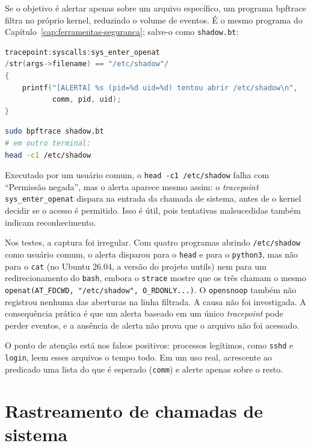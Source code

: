 Se o objetivo é alertar apenas sobre um arquivo específico, um programa bpftrace
filtra no próprio kernel, reduzindo o volume de eventos. É o mesmo programa do
Capítulo~\ref{cap:ferramentas-seguranca}; salve-o como \texttt{shadow.bt}:

\begin{lstlisting}[language=C, caption={\texttt{shadow.bt}: alerta de abertura de \texttt{/etc/shadow}.}]
tracepoint:syscalls:sys_enter_openat
/str(args->filename) == "/etc/shadow"/
{
    printf("[ALERTA] %s (pid=%d uid=%d) tentou abrir /etc/shadow\n",
           comm, pid, uid);
}
\end{lstlisting}

\begin{lstlisting}[language=bash, caption={Execução do alerta e geração de um evento de teste.}]
sudo bpftrace shadow.bt
# em outro terminal:
head -c1 /etc/shadow
\end{lstlisting}

Executado por um usuário comum, o \texttt{head -c1 /etc/shadow} falha com
``Permissão negada'', mas o alerta aparece mesmo assim: o \textit{tracepoint}
\texttt{sys\_enter\_openat} dispara na entrada da chamada de sistema, antes de o
kernel decidir se o acesso é permitido. Isso é útil, pois tentativas malsucedidas
também indicam reconhecimento.

Nos testes, a captura foi irregular. Com quatro programas abrindo
\texttt{/etc/shadow} como usuário comum, o alerta disparou para o \texttt{head} e
para o \texttt{python3}, mas não para o \texttt{cat} (no Ubuntu 26.04, a versão do
projeto uutils) nem para um redirecionamento do \texttt{bash}, embora o
\texttt{strace} mostre que os três chamam o mesmo
\texttt{openat(AT\_FDCWD, "/etc/shadow", O\_RDONLY...)}. O \texttt{opensnoop}
também não registrou nenhuma das aberturas na linha filtrada. A causa não foi
investigada. A consequência prática é que um alerta baseado em um único
\textit{tracepoint} pode perder eventos, e a ausência de alerta não prova que o
arquivo não foi acessado.

O ponto de atenção está nos falsos positivos: processos legítimos, como
\texttt{sshd} e \texttt{login}, leem esses arquivos o tempo todo. Em um uso real,
acrescente ao predicado uma lista do que é esperado (\texttt{comm}) e alerte
apenas sobre o resto.

\section{Rastreamento de chamadas de sistema}
\label{sec:ex-syscalls}

